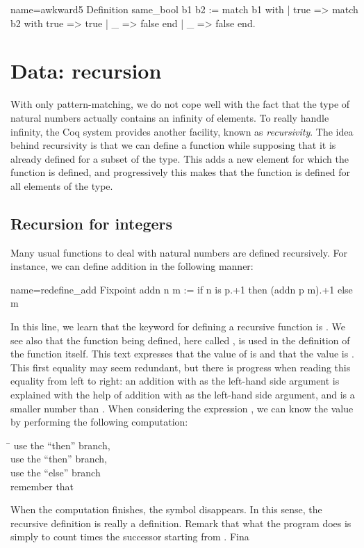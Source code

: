 \begin{coq}{name=awkward5}{}
Definition same_bool b1 b2 :=
  match b1 with
  | true => match b2 with true => true | _ => false end
  | _ => false
  end.
\end{coq}

\section{Data: recursion}

With only pattern-matching, we do not cope well with the fact that the
type  of natural numbers actually contains an infinity of
elements.  To really handle infinity, the Coq system provides another
facility, known as {\em recursivity}.  The idea behind recursivity is
that we can define a function while supposing that it is already
defined for a subset of the type.  This adds a new element for which
the function is defined, and progressively this makes that the
function is defined for all elements of the type.

\subsection{Recursion for integers}

Many usual functions to deal with natural numbers are
defined recursively.  For instance, we can define addition in the
following manner:

\begin{coq}{name=redefine_add}{}
Fixpoint addn n m :=
  if n is p.+1 then (addn p m).+1 else m
\end{coq}
In this line, we learn that the keyword for defining a recursive
function is .  We see also that the function being
defined, here called , is used in the definition of the
function  itself.  This text expresses that the value of
 is
 and that the value  is .
This first equality may
seem redundant, but there is progress when reading this equality from
left to right: an addition with  as the left-hand side argument
is explained with the help of addition with  as the left-hand side
argument, and  is a smaller number than .  When considering the
expression , we can know the value by performing the following
computation:
\begin{tabbing}
\=\kill
{} \> use the ``then'' branch, \\
 \> use the ``then'' branch, \\
 \> use the ``else'' branch\\
\> remember that 
\end{tabbing}
When the computation finishes, the symbol  disappears.  In
this sense, the recursive definition is really a definition.  Remark that
what the  program does is simply to count  times the
successor starting from .  Fina

